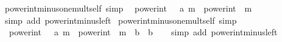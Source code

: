 \begin{isabellebody}
\endisatagproof
{\isafoldproof}%
%
\isadelimproof
\isanewline
%
\endisadelimproof
\isanewline
{}\isamarkupfalse%
\ power{\isacharunderscore}{\kern0pt}int{\isacharunderscore}{\kern0pt}minus{\isacharunderscore}{\kern0pt}one{\isacharunderscore}{\kern0pt}mult{\isacharunderscore}{\kern0pt}self\ {\isacharbrackleft}{\kern0pt}simp{\isacharbrackright}{\kern0pt}{\isacharcolon}{\kern0pt}\isanewline
\ \ {\isachardoublequoteopen}power{\isacharunderscore}{\kern0pt}int\ {\isacharparenleft}{\kern0pt}{\isacharminus}{\kern0pt}{}\ {\isacharcolon}{\kern0pt}{\isacharcolon}{\kern0pt}\ {\isacharprime}{\kern0pt}a{\isacharparenright}{\kern0pt}\ m\ {\isacharasterisk}{\kern0pt}\ power{\isacharunderscore}{\kern0pt}int\ {\isacharparenleft}{\kern0pt}{\isacharminus}{\kern0pt}{}{\isacharparenright}{\kern0pt}\ m\ {\isacharequal}{\kern0pt}\ {}{\isachardoublequoteclose}\isanewline
%
\isadelimproof
\ \ %
\endisadelimproof
%
\isatagproof
{}\isamarkupfalse%
\ {\isacharparenleft}{\kern0pt}simp\ add{\isacharcolon}{\kern0pt}\ power{\isacharunderscore}{\kern0pt}int{\isacharunderscore}{\kern0pt}minus{\isacharunderscore}{\kern0pt}left{\isacharparenright}{\kern0pt}%
\endisatagproof
{\isafoldproof}%
%
\isadelimproof
\isanewline
%
\endisadelimproof
\isanewline
{}\isamarkupfalse%
\ power{\isacharunderscore}{\kern0pt}int{\isacharunderscore}{\kern0pt}minus{\isacharunderscore}{\kern0pt}one{\isacharunderscore}{\kern0pt}mult{\isacharunderscore}{\kern0pt}self{\isacharprime}{\kern0pt}\ {\isacharbrackleft}{\kern0pt}simp{\isacharbrackright}{\kern0pt}{\isacharcolon}{\kern0pt}\isanewline
\ \ {\isachardoublequoteopen}power{\isacharunderscore}{\kern0pt}int\ {\isacharparenleft}{\kern0pt}{\isacharminus}{\kern0pt}{}\ {\isacharcolon}{\kern0pt}{\isacharcolon}{\kern0pt}\ {\isacharprime}{\kern0pt}a{\isacharparenright}{\kern0pt}\ m\ {\isacharasterisk}{\kern0pt}\ {\isacharparenleft}{\kern0pt}power{\isacharunderscore}{\kern0pt}int\ {\isacharparenleft}{\kern0pt}{\isacharminus}{\kern0pt}{}{\isacharparenright}{\kern0pt}\ m\ {\isacharasterisk}{\kern0pt}\ b{\isacharparenright}{\kern0pt}\ {\isacharequal}{\kern0pt}\ b{\isachardoublequoteclose}\isanewline
%
\isadelimproof
\ \ %
\endisadelimproof
%
\isatagproof
{}\isamarkupfalse%
\ {\isacharparenleft}{\kern0pt}simp\ add{\isacharcolon}{\kern0pt}\ power{\isacharunderscore}{\kern0pt}int{\isacharunderscore}{\kern0pt}minus{\isacharunderscore}{\kern0pt}left{\isacharparenright}{\kern0pt}%
\endisatagproof
{\isafoldproof}%
%
\isadelimproof
\isanewline
%
\endisadelimproof
\isanewline

\end{isabellebody}
